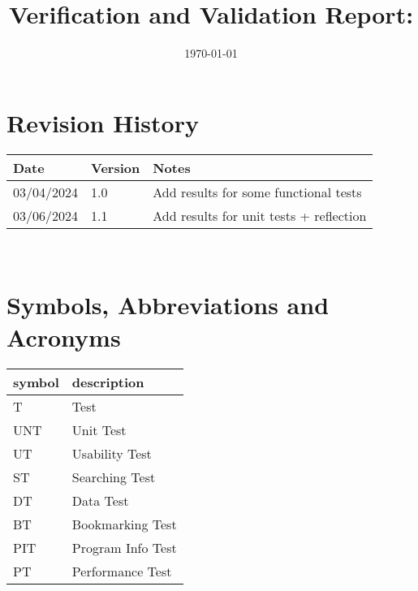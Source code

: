 \documentclass[12pt, titlepage]{article}
\begin{document}
\title{Verification and Validation Report: \progname} 
\author{\authname}
\date{\today}
	
\maketitle


\section{Revision History}

\begin{tabularx}{\textwidth}{p{3cm}p{2cm}X}
\toprule {\bf Date} & {\bf Version} & {\bf Notes}\\
\midrule
03/04/2024 & 1.0 & Add results for some functional tests\\
03/06/2024 & 1.1 & Add results for unit tests + reflection\\
\bottomrule
\end{tabularx}

~\newpage

\section{Symbols, Abbreviations and Acronyms}

\renewcommand{\arraystretch}{1.2}
\begin{tabular}{l l} 
  \toprule		
  \textbf{symbol} & \textbf{description}\\
  \midrule 
  T & Test\\
  UNT & Unit Test\\
  UT & Usability Test\\
  ST & Searching Test\\
  DT & Data Test\\
  BT & Bookmarking Test\\
  PIT & Program Info Test\\
  PT & Performance Test\\
  \bottomrule
\end{tabular}\\


\newpage

\tableofcontents

\listoftables %

\listoffigures %

\newpage

\end{document}
